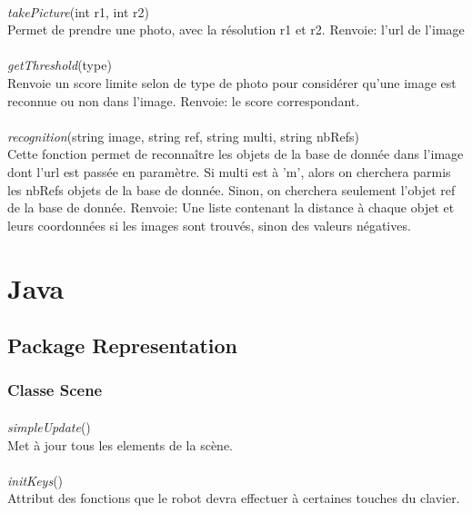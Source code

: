\documentclass[12pt]{report}
\begin{document}
\paragraph{}
\textit{takePicture}(int r1, int r2)\\
Permet de prendre une photo, avec la résolution r1 et r2.
Renvoie: l'url de l'image

\paragraph{}
\textit{getThreshold}(type)\\
Renvoie un score limite selon de type de photo pour considérer qu'une image est reconnue ou non dans l'image.
Renvoie: le score correspondant.

\paragraph{}
\textit{recognition}(string image, string ref, string multi, string nbRefs)\\
Cette fonction permet de reconnaître les objets de la base de donnée dans l'image dont l'url est passée en paramètre. Si multi est à 'm', alors on cherchera parmis les nbRefs objets de la base de donnée. Sinon, on cherchera seulement l'objet ref de la base de donnée.
Renvoie: Une liste contenant la distance à chaque objet et leurs coordonnées si les images sont trouvés, sinon des valeurs négatives.

\section{Java}

\subsection{Package Representation}

\subsubsection{Classe Scene}

\paragraph{}
\textit{simpleUpdate}()\\
Met à jour tous les elements de la scène.

\paragraph{}
\textit{initKeys}()\\
Attribut des fonctions que le robot devra effectuer à certaines touches du clavier.
\end{document}
